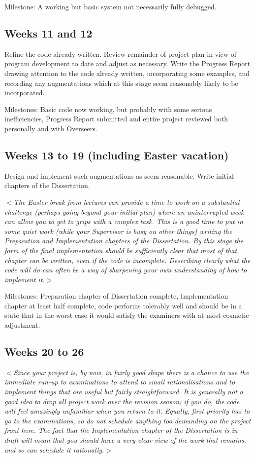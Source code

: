 \documentclass[12pt]{article}
\newcommand{\al}{$<$}
\newcommand{\ar}{$>$}
\begin{document}
Milestone: A working but basic system not necessarily fully debugged.


\subsection*{Weeks 11 and 12}

Refine the code already written.  Review remainder of project plan in
view of program development to date and adjust as necessary.  Write
the Progress Report drawing attention to the code already written,
incorporating some examples, and recording any augmentations which at
this stage seem reasonably likely to be incorporated.

Milestones: Basic code now working, but probably with some serious
inefficiencies, Progress Report submitted and entire project reviewed
both personally and with Overseers.


\subsection*{Weeks 13 to 19 (including Easter vacation)}

Design and implement such augmentations as seem reasonable.
Write initial chapters of the Dissertation.

\al\emph{The Easter break from lectures can provide a time to work on
  a substantial challenge (perhaps going beyond your initial plan)
  where an uninterrupted week can allow you to get to grips with a
  complex task.  This is a good time to put in some quiet work (while
  your Supervisor is busy on other things) writing the Preparation and
  Implementation chapters of the Dissertation.  By this stage the form
  of the final implementation should be sufficiently clear that most
  of that chapter can be written, even if the code is incomplete.
  Describing clearly what the code will do can often be a way of
  sharpening your own understanding of how to implement it.}\ar

Milestones: Preparation chapter of Dissertation complete,
Implementation chapter at least half complete, code performs tolerably
well and should be in a state that in the worst case it would satisfy
the examiners with at most cosmetic adjustment.


\subsection*{Weeks 20 to 26}

\al\emph{Since your project is, by now, in fairly good shape there is
  a chance to use the immediate run-up to examinations to attend to
  small rationalisations and to implement things that are useful but
  fairly straightforward.  It is generally not a good idea to drop all
  project work over the revision season; if you do, the code will feel
  amazingly unfamiliar when you return to it.  Equally, first priority
  has to go to the examinations, so do not schedule anything too
  demanding on the project front here.  The fact that the
  Implementation chapter of the Dissertation is in draft will mean
  that you should have a very clear view of the work that remains, and
  so can schedule it rationally.}\ar
\end{document}
